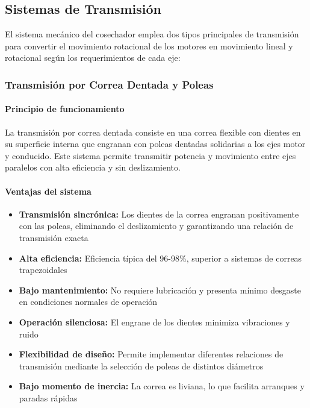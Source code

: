 
\subsection{Sistemas de Transmisión}

El sistema mecánico del cosechador emplea dos tipos principales de transmisión para convertir el movimiento rotacional de los motores en movimiento lineal y rotacional según los requerimientos de cada eje:

\subsubsection{Transmisión por Correa Dentada y Poleas}

\paragraph{Principio de funcionamiento}
La transmisión por correa dentada consiste en una correa flexible con dientes en su superficie interna que engranan con poleas dentadas solidarias a los ejes motor y conducido. Este sistema permite transmitir potencia y movimiento entre ejes paralelos con alta eficiencia y sin deslizamiento.

\paragraph{Ventajas del sistema}
\begin{itemize}
    \item \textbf{Transmisión sincrónica:} Los dientes de la correa engranan positivamente con las poleas, eliminando el deslizamiento y garantizando una relación de transmisión exacta
    \item \textbf{Alta eficiencia:} Eficiencia típica del 96-98\%, superior a sistemas de correas trapezoidales
    \item \textbf{Bajo mantenimiento:} No requiere lubricación y presenta mínimo desgaste en condiciones normales de operación
    \item \textbf{Operación silenciosa:} El engrane de los dientes minimiza vibraciones y ruido
    \item \textbf{Flexibilidad de diseño:} Permite implementar diferentes relaciones de transmisión mediante la selección de poleas de distintos diámetros
    \item \textbf{Bajo momento de inercia:} La correa es liviana, lo que facilita arranques y paradas rápidas
\end{itemize}

